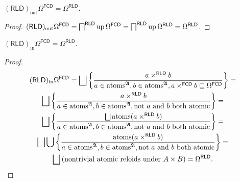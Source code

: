 \begin{prop}
  $(\mathsf{RLD})_{\operatorname{out}} \Omega^{\mathsf{FCD}} =
  \Omega^{\mathsf{RLD}}$.
\end{prop}

\begin{proof}
  $(\mathsf{RLD})_{\operatorname{out}} \Omega^{\mathsf{FCD}} =
  \bigsqcap^{\mathsf{RLD}} \operatorname{up} \Omega^{\mathsf{FCD}} =
  \bigsqcap^{\mathsf{RLD}} \operatorname{up} \Omega^{\mathsf{RLD}} =
  \Omega^{\mathsf{RLD}}$.
\end{proof}

\begin{prop}
  $(\mathsf{RLD})_{\operatorname{in}} \Omega^{\mathsf{FCD}} = \Omega^{\mathsf{RLD}}$.
\end{prop}

\begin{proof}
  \begin{multline*}
  (\mathsf{RLD})_{\operatorname{in}} \Omega^{\mathsf{FCD}} = \bigsqcup
  \setcond{ a \times^{\mathsf{RLD}} b }{ a \in
  \atoms^{\mathfrak{A}}, b \in \atoms^{\mathfrak{A}}, a
  \times^{\mathsf{FCD}} b \sqsubseteq \Omega^{\mathsf{FCD}}
  } = \\
  \bigsqcup \setcond{ a \times^{\mathsf{RLD}} b }{
  a \in \atoms^{\mathfrak{A}}, b \in
  \atoms^{\mathfrak{A}}, \text{not $a$ and $b$ both atomic} } = \\
  \bigsqcup \setcond{ \bigsqcup \atoms (a \times^{\mathsf{RLD}} b)
  }{ a \in \atoms^{\mathfrak{A}}, b \in
  \atoms^{\mathfrak{A}}, \text{not $a$ and $b$ both atomic} } = \\
  \bigsqcup \bigcup \setcond{ \atoms (a \times^{\mathsf{RLD}} b) }{
  a \in \atoms^{\mathfrak{A}}, b \in
  \atoms^{\mathfrak{A}}, \text{not $a$ and $b$ both atomic} } = \\
  \bigsqcup \left( \text{nontrivial atomic reloids under $A \times B$} \right) =
  \Omega^{\mathsf{RLD}}.
  \end{multline*}
\end{proof}

